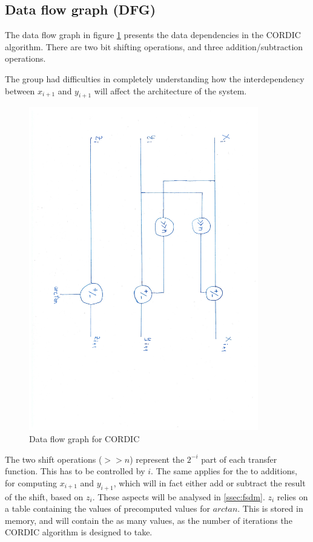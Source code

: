 \documentclass[12pt, a4paper,oneside]{article}
\begin{document}
\subsection{Data flow graph (DFG)}
The data flow graph in figure \ref{fig:cordic_dfg} presents the data dependencies
in the CORDIC algorithm. There are two bit shifting operations, and three
addition/subtraction operations. 


The group had difficulties 
in completely understanding how the interdependency between $x_{i+1}$
and $y_{i+1}$ will affect the architecture of the system.

\begin{figure}[H]
	\centering
    \includegraphics[clip, trim=2cm 7cm 2.2cm 2.5cm, width = 10cm,angle=90]{cordic_dfg.pdf}
	\caption{Data flow graph for CORDIC}
	\label{fig:cordic_dfg}
\end{figure}

The two shift operations ($>>n$) represent the $2^{-i}$ part of each transfer 
function. This has to be controlled by $i$. The same applies for the to 
additions, for computing $x_{i+1}$ and $y_{i+1}$, which will in fact 
either add or subtract the result of the shift, based on $z_i$. These aspects
will be analysed in \ref{ssec:fsdm}. $z_i$ relies on a table containing the 
values of precomputed values for $arctan$. This is stored in memory, and will
contain the as many values, as the number of iterations the CORDIC algorithm 
is designed to take.
\end{document}
